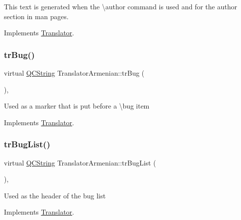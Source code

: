 This text is generated when the \textbackslash{}author command is used and for the author section in man pages. 

Implements \mbox{\hyperlink{class_translator}{Translator}}.

\mbox{\label{class_translator_armenian_a0080a67b2122ec5982ddb895484a0b19}} 
\subsubsection{\texorpdfstring{trBug()}{trBug()}}
{\footnotesize\ttfamily virtual \mbox{\hyperlink{class_q_c_string}{Q\+C\+String}} Translator\+Armenian\+::tr\+Bug (\begin{DoxyParamCaption}{ }\end{DoxyParamCaption})\hspace{0.3cm}{\ttfamily [inline]}, {\ttfamily [virtual]}}

Used as a marker that is put before a \textbackslash{}bug item 

Implements \mbox{\hyperlink{class_translator}{Translator}}.

\mbox{\label{class_translator_armenian_afe63a0ee3fdf540bfd9f49dc45a8bbb5}} 
\subsubsection{\texorpdfstring{trBugList()}{trBugList()}}
{\footnotesize\ttfamily virtual \mbox{\hyperlink{class_q_c_string}{Q\+C\+String}} Translator\+Armenian\+::tr\+Bug\+List (\begin{DoxyParamCaption}{ }\end{DoxyParamCaption})\hspace{0.3cm}{\ttfamily [inline]}, {\ttfamily [virtual]}}

Used as the header of the bug list 

Implements \mbox{\hyperlink{class_translator}{Translator}}.

\mbox{\label{class_translator_armenian_aa5f787d51247c117e729adc3efcfa112}} 
